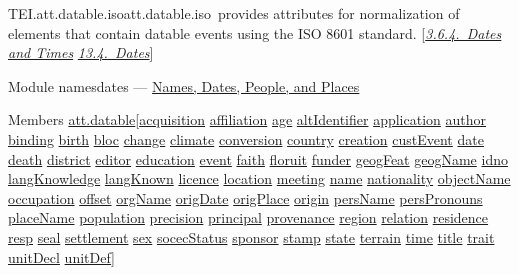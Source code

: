 \begin{reflist}
\item[]\begin{specHead}{TEI.att.datable.iso}{att.datable.iso} provides attributes for normalization of elements that contain datable events using the ISO 8601 standard. [\textit{\hyperref[CONADA]{3.6.4.\ Dates and Times}} \textit{\hyperref[NDDATE]{13.4.\ Dates}}]\end{specHead} 
    \item[{Module}]
  namesdates — \hyperref[ND]{Names, Dates, People, and Places}
    \item[{Members}]
  \hyperref[TEI.att.datable]{att.datable}[\hyperref[TEI.acquisition]{acquisition} \hyperref[TEI.affiliation]{affiliation} \hyperref[TEI.age]{age} \hyperref[TEI.altIdentifier]{altIdentifier} \hyperref[TEI.application]{application} \hyperref[TEI.author]{author} \hyperref[TEI.binding]{binding} \hyperref[TEI.birth]{birth} \hyperref[TEI.bloc]{bloc} \hyperref[TEI.change]{change} \hyperref[TEI.climate]{climate} \hyperref[TEI.conversion]{conversion} \hyperref[TEI.country]{country} \hyperref[TEI.creation]{creation} \hyperref[TEI.custEvent]{custEvent} \hyperref[TEI.date]{date} \hyperref[TEI.death]{death} \hyperref[TEI.district]{district} \hyperref[TEI.editor]{editor} \hyperref[TEI.education]{education} \hyperref[TEI.event]{event} \hyperref[TEI.faith]{faith} \hyperref[TEI.floruit]{floruit} \hyperref[TEI.funder]{funder} \hyperref[TEI.geogFeat]{geogFeat} \hyperref[TEI.geogName]{geogName} \hyperref[TEI.idno]{idno} \hyperref[TEI.langKnowledge]{langKnowledge} \hyperref[TEI.langKnown]{langKnown} \hyperref[TEI.licence]{licence} \hyperref[TEI.location]{location} \hyperref[TEI.meeting]{meeting} \hyperref[TEI.name]{name} \hyperref[TEI.nationality]{nationality} \hyperref[TEI.objectName]{objectName} \hyperref[TEI.occupation]{occupation} \hyperref[TEI.offset]{offset} \hyperref[TEI.orgName]{orgName} \hyperref[TEI.origDate]{origDate} \hyperref[TEI.origPlace]{origPlace} \hyperref[TEI.origin]{origin} \hyperref[TEI.persName]{persName} \hyperref[TEI.persPronouns]{persPronouns} \hyperref[TEI.placeName]{placeName} \hyperref[TEI.population]{population} \hyperref[TEI.precision]{precision} \hyperref[TEI.principal]{principal} \hyperref[TEI.provenance]{provenance} \hyperref[TEI.region]{region} \hyperref[TEI.relation]{relation} \hyperref[TEI.residence]{residence} \hyperref[TEI.resp]{resp} \hyperref[TEI.seal]{seal} \hyperref[TEI.settlement]{settlement} \hyperref[TEI.sex]{sex} \hyperref[TEI.socecStatus]{socecStatus} \hyperref[TEI.sponsor]{sponsor} \hyperref[TEI.stamp]{stamp} \hyperref[TEI.state]{state} \hyperref[TEI.terrain]{terrain} \hyperref[TEI.time]{time} \hyperref[TEI.title]{title} \hyperref[TEI.trait]{trait} \hyperref[TEI.unitDecl]{unitDecl} \hyperref[TEI.unitDef]{unitDef}]

\end{reflist}
